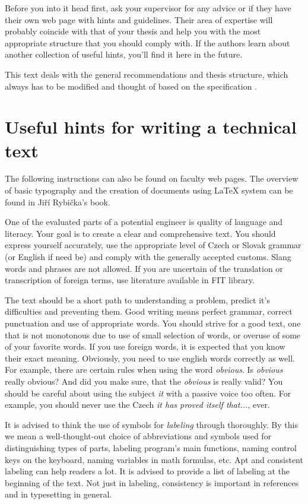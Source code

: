Before you into it head first, ask your supervisor for any advice or if they have their own web page with hints and guidelines. Their area of expertise will probably coincide with that of your thesis and help you with the most appropriate structure that you should comply with. If the authors learn about another collection of useful hints, you'll find it here in the future.

This text deals with the general recommendations and thesis structure, which always has to be modified and thought of based on the specification \cite{Cernocky}.


\section{Useful hints for writing a technical text}

The following instructions can also be found on faculty web pages\cite{fitWeb}. The overview of basic typography and the creation of documents using \LaTeX{} system can be found in Jiří Rybička's book\cite{Rybicka}.

One of the evaluated parts of a potential engineer is quality of language and literacy. Your goal is to create a clear and comprehensive text. You should express yourself accurately, use the appropriate level of Czech or Slovak grammar (or English if need be) and comply with the generally accepted customs. Slang words and phrases are not allowed. If you are uncertain of the translation or transcription of foreign terms, use literature available in FIT library.

The text should be a short path to understanding a problem, predict it's difficulties and preventing them. Good writing means perfect grammar, correct punctuation and use of appropriate words. You should strive for a good text, one that is not monotonous due to use of small selection of words, or overuse of some of your favorite words. If you use foreign words, it is expected that you know their exact meaning. Obviously, you need to use english words correctly as well. For example, there are certain rules when using the word {\it obvious}. Is {\it obvious} really obvious? And did you make sure, that the {\it obvious} is really valid? You should be careful about using the subject {\it it} with a passive voice too often. For example, you should never use the Czech {\it it has proved itself that...}, ever.

It is advised to think the use of symbols for {\it labeling} through thoroughly. By this we mean a well-thought-out choice of abbreviations and symbols used for distinguishing types of parts, labeling program's main functions, naming control keys on the keyboard, naming variables in math formulas, etc. Apt and consistent labeling can help readers a lot. It is advised to provide a list of labeling at the beginning of the text. Not just in labeling, consistency is important in references and in typesetting in general.

